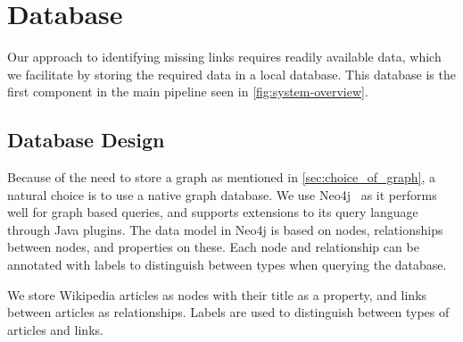 \section{Database}\label{sec:db}
Our approach to identifying missing links requires readily available data, which we facilitate by storing the required data in a local database. This database is the first component in the main pipeline seen in \cref{fig:system-overview}. 

\subsection{Database Design}\label{sec:db_design}
Because of the need to store a graph as mentioned in \cref{sec:choice_of_graph}, a natural choice is to use a native graph database. We use Neo4j~\cite{neo4j} as it performs well for graph based queries, and supports extensions to its query language through Java plugins. The data model in Neo4j is based on nodes, relationships between nodes, and properties on these. Each node and relationship can be annotated with labels to distinguish between types when querying the database.

We store Wikipedia articles as nodes with their title as a property, and links between articles as relationships. Labels are used to distinguish between types of articles and links.

